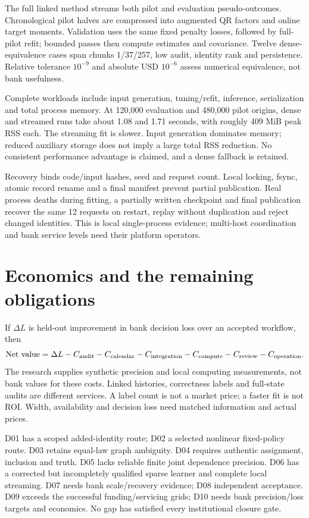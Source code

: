The full linked method streams both pilot and evaluation pseudo-outcomes. Chronological pilot halves are compressed into augmented QR factors and online target moments. Validation uses the same fixed penalty losses, followed by full-pilot refit; bounded passes then compute estimates and covariance. Twelve dense-equivalence cases span chunks 1/37/257, low audit, identity rank and persistence. Relative tolerance $10^{-9}$ and absolute USD $10^{-6}$ assess numerical equivalence, not bank usefulness.

Complete workloads include input generation, tuning/refit, inference, serialization and total process memory. At 120,000 evaluation and 480,000 pilot origins, dense and streamed runs take about 1.08 and 1.71 seconds, with roughly 409 MiB peak RSS each. The streaming fit is slower. Input generation dominates memory; reduced auxiliary storage does not imply a large total RSS reduction. No consistent performance advantage is claimed, and a dense fallback is retained.

Recovery binds code/input hashes, seed and request count. Local locking, fsync, atomic record rename and a final manifest prevent partial publication. Real process deaths during fitting, a partially written checkpoint and final publication recover the same 12 requests on restart, replay without duplication and reject changed identities. This is local single-process evidence; multi-host coordination and bank service levels need their platform operators.

\section{Economics and the remaining obligations}
If $\Delta L$ is held-out improvement in bank decision loss over an accepted workflow, then
\[
 \mathrm{Net\ value}=\Delta L-C_{\rm audit}-C_{\rm calendar}-C_{\rm integration}
 -C_{\rm compute}-C_{\rm review}-C_{\rm operation}.
\]
The research supplies synthetic precision and local computing measurements, not bank values for these costs. Linked histories, correctness labels and full-state audits are different services. A label count is not a market price; a faster fit is not ROI. Width, availability and decision loss need matched information and actual prices.

D01 has a scoped added-identity route; D02 a selected nonlinear fixed-policy route. D03 retains equal-law graph ambiguity. D04 requires authentic assignment, inclusion and truth. D05 lacks reliable finite joint dependence precision. D06 has a corrected but incompletely qualified sparse learner and complete local streaming. D07 needs bank scale/recovery evidence; D08 independent acceptance. D09 exceeds the successful funding/servicing grids; D10 needs bank precision/loss targets and economics. No gap has satisfied every institutional closure gate.

